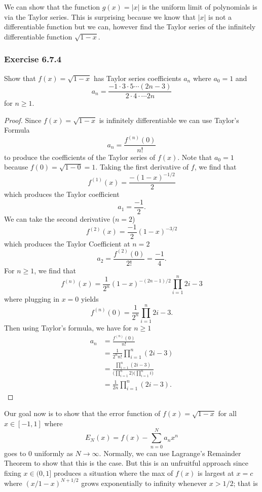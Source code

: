 We can show that the function \( g(x) = | x |  \) is the uniform limit of polynomials is via the Taylor series. This is surprising because we know that \( | x  |   \) is not a differentiable function but we can, however find the Taylor series of the infinitely differentiable function \( \sqrt{ 1 - x  }.  \)

\subsubsection{Exercise 6.7.4} Show that \( f(x) = \sqrt{ 1 - x  }  \) has Taylor series coefficients \( a_{n} \) where \( a_{0} = 1  \) and 
\[  a_{n} = \frac{  -1 \cdot 3 \cdot 5 \dotsb (2n-3)  }{ 2 \cdot 4 \cdot \dotsb 2n }  \] for \( n \geq 1  \).
\begin{proof}
Since \( f(x) = \sqrt{ 1 - x  }    \) is infinitely differentiable we can use Taylor's Formula 
\[  a_n = \frac{ f^{(n)}(0)  }{ n!  }  \] to produce the coefficients of the Taylor series of \( f(x)  \). Note that \( a_0 = 1  \) because \( f(0) = \sqrt{ 1 - 0  } = 1   \). Taking the first derivative of \( f \), we find that 
\[  f^{(1)}(x) = \frac{ -(1-x)^{-1/2} }{ 2 } \]
which produces the Taylor coefficient 
\[  a_1 = \frac{ -1 }{ 2 }. \] We can take the second derivative (\( n=2 \)) 
\[  f^{(2)}(x) = \frac{ -1 }{ 2 } (1-x)^{-3/2}  \] which produces the Taylor Coefficient at \( n =2  \) 
\[  a_2 = \frac{ f^{(2)}(0)  }{ 2!  } = \frac{ -1  }{ 4 }. \]
For \( n \geq 1  \), we find that 
\[  f^{(n)}(x) = \frac{ 1 }{ 2^{n} } (1-x)^{-(2n-1)/2 } \prod_{i=1}^{n} 2i-3  \]
where plugging in \( x = 0  \) yields 
\[  f^{(n)}(0) = \frac{ 1 }{ 2^{n} } \prod_{i=1}^{n} 2i -3. \]
Then using Taylor's formula, we have for \( n \geq 1  \) 
\begin{align*}
    a_n &= \frac{ f^{(n)}(0) }{ n! }  \\
        &= \frac{ 1 }{ 2^{n}n! } \prod_{i=1}^{n} (2i-3) \\
        &= \frac{ \prod_{i=1}^{n} (2i-3)}{ \Big( \prod_{i=1}^{n} 2 \Big) \Big( \prod_{i=1}^{n} i \Big)  }   \\
        &= \frac{ 1 }{ 2n } \prod_{i=1}^{n} (2i-3).
\end{align*}
\end{proof} 
Our goal now is to show that the error function of \( f(x) = \sqrt{ 1 - x  }  \) for all \( x \in [-1,1] \) where 
\[ E_{N}(x) = f(x) - \sum_{ n=0  }^{ N  } a_{n} x^{n} \]
goes to \( 0  \) uniformly as \( N \to \infty  \). Normally, we can use Lagrange's Remainder Theorem to show that this is the case. But this is an unfruitful approach since fixing \( x \in (0,1]  \) produces a situation where the max of \( f(x)  \) is largest at \( x = c  \) where \( (x / 1 - x)^{N + 1 /2 } \) grows exponentially to infinity whenever \( x > 1 / 2  \); that is 
